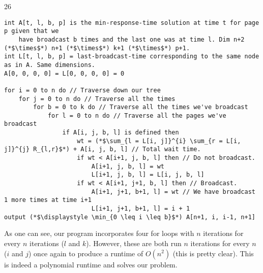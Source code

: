 \documentclass{article}
\begin{document}
\begin{prob} {26}
	\pagebreak
	\begin{lstlisting}
int A[t, l, b, p] is the min-response-time solution at time t for page p given that we
    have broadcast b times and the last one was at time l. Dim n+2 (*$\times$*) n+1 (*$\times$*) k+1 (*$\times$*) p+1.
int L[t, l, b, p] = last-broadcast-time corresponding to the same node as in A. Same dimensions.
A[0, 0, 0, 0] = L[0, 0, 0, 0] = 0

for i = 0 to n do // Traverse down our tree
    for j = 0 to n do // Traverse all the times
        for b = 0 to k do // Traverse all the times we've broadcast
            for l = 0 to n do // Traverse all the pages we've broadcast
                if A[i, j, b, l] is defined then
                    wt = (*$\sum_{l = L[i, j]}^{i} \sum_{r = L[i, j]}^{j} R_{l,r}$*) + A[i, j, b, l] // Total wait time.
                    if wt < A[i+1, j, b, l] then // Do not broadcast.
                        A[i+1, j, b, l] = wt
                        L[i+1, j, b, l] = L[i, j, b, l]
                    if wt < A[i+1, j+1, b, l] then // Broadcast.
                        A[i+1, j+1, b+1, l] = wt // We have broadcast 1 more times at time i+1
                        L[i+1, j+1, b+1, l] = i + 1
output (*$\displaystyle \min_{0 \leq i \leq b}$*) A[n+1, i, i-1, n+1]
	\end{lstlisting}

	As one can see, our program incorporates four for loops with $n$ iterations for every $n$ iterations ($l$ and $k$).  However, these are both run $n$ iterations for every $n$ ($i$ and $j$) once again to produce a runtime of $O(n^2)$ (this is pretty clear).  This is indeed a polynomial runtime and solves our problem.
\end{prob}
\end{document}
